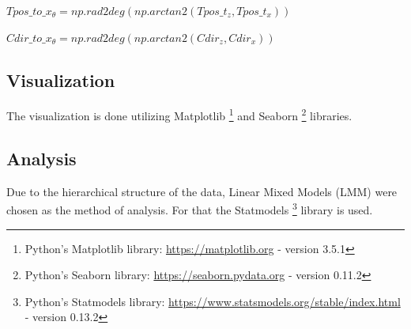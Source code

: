 \begin{enumerate}
\begin{enumerate}
		\begin{center}
			$Tpos\_to\_x_{\theta} = np.rad2deg(np.arctan2(Tpos\_t_{z}, Tpos\_t_{x}))$
		\end{center}
	
		\begin{center}
			$Cdir\_to\_x_{\theta} = np.rad2deg(np.arctan2(Cdir_{z}, Cdir_{x}))$
		\end{center}
		
	\end{enumerate}
\end{enumerate}


\subsection{Visualization}

The visualization is done utilizing Matplotlib \footnote{Python's Matplotlib library: \href{https://matplotlib.org}{https://matplotlib.org} - version 3.5.1} and Seaborn \footnote{Python's Seaborn library: \href{https://seaborn.pydata.org}{https://seaborn.pydata.org} - version 0.11.2} libraries.

\subsection{Analysis}
Due to the hierarchical structure of the data, Linear Mixed Models (LMM) were chosen as the method of analysis. For that the Statmodels \footnote{Python's Statmodels library: \href{https://www.statsmodels.org/stable/index.html}{https://www.statsmodels.org/stable/index.html} - version 0.13.2} library is used.


